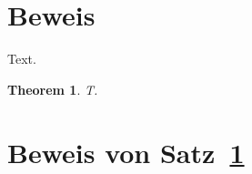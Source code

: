 \documentclass{article}
\begin{document}
\tableofcontents
\section{\foreignlanguage{ngerman}{Beweis}}
Text.
\newtheorem{theorem}{Theorem}
\begin{theorem}\label{thm} T. \end{theorem}
\section{\foreignlanguage{ngerman}{Beweis von Satz~\ref{thm}}}
\end{document}
